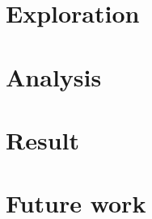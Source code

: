 \documentclass[
10pt, %
a4paper, %
oneside, %
headinclude,footinclude, %
BCOR5mm, %
]{scrartcl}
\begin{document}

\section{Exploration}


\section{Analysis}


\section{Result}


\section{Future work}




\end{document}
